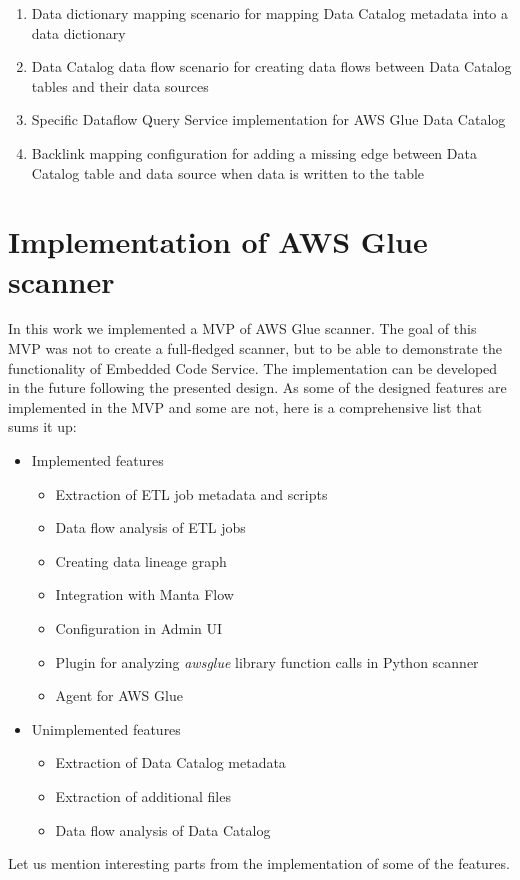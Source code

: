 \begin{enumerate}
    \item Data dictionary mapping scenario for mapping Data Catalog metadata into a data dictionary
    \item Data Catalog data flow scenario for creating data flows between Data Catalog tables and their data sources
    \item Specific Dataflow Query Service implementation for AWS Glue Data Catalog
    \item Backlink mapping configuration for adding a missing edge between Data Catalog table and data source when data is written to the table
\end{enumerate}

\section{Implementation of AWS Glue scanner}
In this work we implemented a MVP of AWS Glue scanner. The goal of this MVP was not to create a full-fledged scanner, but to be able to demonstrate the functionality of Embedded Code Service. The implementation can be developed in the future following the presented design. As some of the designed features are implemented in the MVP and some are not, here is a comprehensive list that sums it up:
\begin{itemize}
    \item Implemented features
    \begin{itemize}
        \item Extraction of ETL job metadata and scripts
        \item Data flow analysis of ETL jobs
        \item Creating data lineage graph
        \item Integration with Manta Flow
        \item Configuration in Admin UI
        \item Plugin for analyzing \textit{awsglue} library function calls in Python scanner
        \item Agent for AWS Glue
    \end{itemize}
    \item Unimplemented features
    \begin{itemize}
        \item Extraction of Data Catalog metadata
        \item Extraction of additional files
        \item Data flow analysis of Data Catalog    
    \end{itemize}
\end{itemize}
\par
Let us mention interesting parts from the implementation of some of the features.

